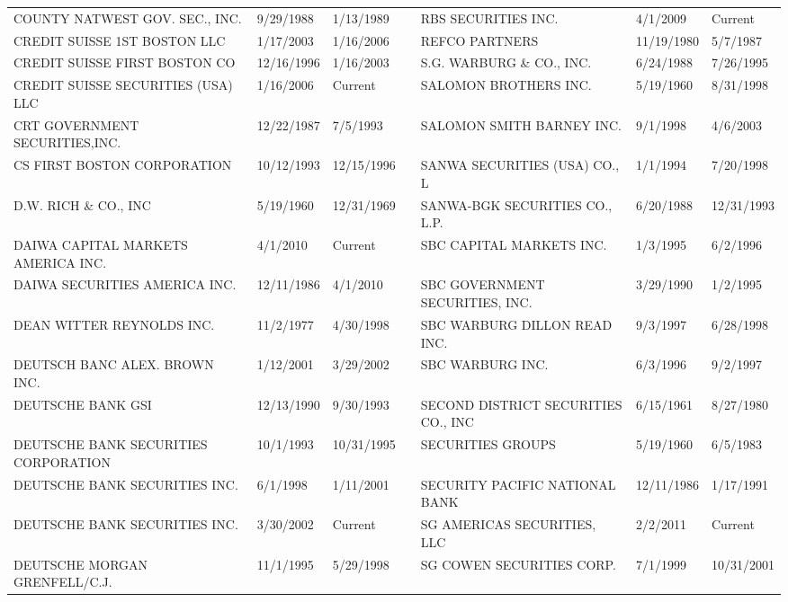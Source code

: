 \documentclass{article}
\begin{document}
\begin{tabular}{lllllll}
COUNTY NATWEST GOV. SEC., INC.       & 9/29/1988 & 1/13/1989 &  & RBS SECURITIES INC. & 4/1/2009 & Current \\
CREDIT SUISSE 1ST BOSTON LLC    & 1/17/2003 & 1/16/2006 &  & REFCO PARTNERS                      & 11/19/1980 & 5/7/1987 \\
CREDIT SUISSE FIRST BOSTON CO       & 12/16/1996 & 1/16/2003 &  & S.G. WARBURG \& CO., INC.             & 6/24/1988 & 7/26/1995 \\
CREDIT SUISSE SECURITIES (USA) LLC & 1/16/2006 & Current &  & SALOMON BROTHERS INC.               & 5/19/1960 & 8/31/1998 \\
CRT GOVERNMENT SECURITIES,INC.      & 12/22/1987 & 7/5/1993 &  & SALOMON SMITH BARNEY INC.       & 9/1/1998 & 4/6/2003 \\
CS FIRST BOSTON CORPORATION         & 10/12/1993 & 12/15/1996 &  & SANWA SECURITIES (USA) CO., L       & 1/1/1994 & 7/20/1998 \\
D.W. RICH \& CO., INC                 & 5/19/1960 & 12/31/1969 &  & SANWA-BGK SECURITIES CO., L.P.      & 6/20/1988 & 12/31/1993 \\
DAIWA CAPITAL MARKETS AMERICA INC. & 4/1/2010 & Current &  & SBC CAPITAL MARKETS INC.        & 1/3/1995 & 6/2/1996 \\
DAIWA SECURITIES AMERICA INC.       & 12/11/1986 & 4/1/2010 &  & SBC GOVERNMENT SECURITIES, INC. & 3/29/1990 & 1/2/1995 \\
DEAN WITTER REYNOLDS INC.           & 11/2/1977 & 4/30/1998 &  & SBC WARBURG DILLON READ INC.    & 9/3/1997 & 6/28/1998 \\
DEUTSCH BANC ALEX. BROWN INC.        & 1/12/2001 & 3/29/2002 &  & SBC WARBURG INC.                & 6/3/1996 & 9/2/1997 \\
DEUTSCHE BANK GSI                    & 12/13/1990 & 9/30/1993 &  & SECOND DISTRICT SECURITIES CO., INC  & 6/15/1961 & 8/27/1980 \\
DEUTSCHE BANK SECURITIES CORPORATION & 10/1/1993 & 10/31/1995 &  & SECURITIES GROUPS                    & 5/19/1960 & 6/5/1983 \\
DEUTSCHE BANK SECURITIES INC.        & 6/1/1998 & 1/11/2001 &  & SECURITY PACIFIC NATIONAL BANK       & 12/11/1986 & 1/17/1991 \\
DEUTSCHE BANK SECURITIES INC.        & 3/30/2002 & Current &  & SG AMERICAS SECURITIES, LLC & 2/2/2011 & Current \\
DEUTSCHE MORGAN GRENFELL/C.J.        & 11/1/1995 & 5/29/1998 &  & SG COWEN SECURITIES CORP.           & 7/1/1999 & 10/31/2001 \\

\end{tabular}
\end{document}
